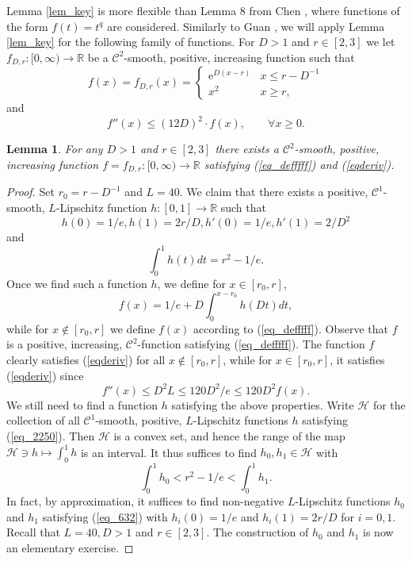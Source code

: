 \documentclass[12pt,a4paper]{article}
\newcommand{\e}{\mathrm{e}}
\newcommand{\RR}{\mathbb{R}}
\newtheorem{lemma}[theorem]{Lemma}
\theoremstyle{definition}
\newcommand{\cH}{\mathcal{H}}
\begin{document}
%
Lemma \ref{lem_key} is more flexible than Lemma 8 from Chen \cite{chen}, where functions of the form $f(t) = t^q$ are considered. Similarly to Guan \cite{guan}, we will apply 
Lemma \ref{lem_key} for the following family of functions. For
$D > 1$ and $r \in [2,3]$ we let $f_{D,r}: [0, \infty) \rightarrow \RR$ be a $\mathcal C^2$-smooth, positive, increasing function such that
\begin{equation}\label{eq_defffff}
f(x) = f_{D,r} (x) = \begin{cases}
 \e^{D(x - r)} & x \leq r- D^{-1} \\
 x^2  & x \geq r ,
 \end{cases}
\end{equation}
and
\begin{equation} \label{eqderiv}
f'' (x) \leq (12 D)^2 \cdot f(x) , \qquad \forall x \geq 0 .
\end{equation}

\begin{lemma} For any $D > 1$ and $r \in [2,3]$ there exists a $\mathcal C^2$-smooth, positive, increasing function $f = f_{D,r}: [0, \infty) \rightarrow \RR$ satisfying 
(\ref{eq_defffff}) and (\ref{eqderiv}). \label{lem_1444}
\end{lemma}

\begin{proof} Set $r_0 = r - D^{-1}$ and $L = 40$. We claim that there exists a positive, $\mathcal C^1$-smooth, $L$-Lipschitz function $h: [0, 1] \rightarrow \RR$
such that 
\begin{equation}  h(0) = 1/e, h(1) = 2 r/D, h'(0) = 1/e, h'(1) = 2 / D^2  \label{eq_2250} 
\end{equation}
and 
$$\int_{0}^1 h(t) dt =  r^2 - 1/e. 
$$
Once we find such a function $h$, we define for $x \in [r_0, r]$,
$$ f(x) = 1/e + D \int_{0}^{x-r_0} h \left( D t \right) dt, $$
while for $x \not \in [r_0, r]$ we define $f(x)$ according to (\ref{eq_defffff}). Observe that $f$ is a positive, increasing, $\mathcal C^2$-function
satisfying (\ref{eq_defffff}). The function $f$ clearly satisfies (\ref{eqderiv}) for all $x \not \in [r_0, r]$, 
while for $x \in [r_0, r]$, it satisfies (\ref{eqderiv}) since
 $$ f''(x)  \leq D^2 L \leq 120 D^2 / e \leq 120 D^2 f(x). $$
We still need to find a function $h$ satisfying the above properties. Write $\cH$ for the collection of all $\mathcal C^1$-smooth, positive, $L$-Lipschitz functions $h$ satisfying (\ref{eq_2250}).
Then $\cH$ is a convex set, and hence the range of the map $\cH \ni h \mapsto \int_0^1 h$ is an interval.
It thus suffices to find $h_0, h_1 \in \cH$ with 
\begin{equation}  \int_0^1 h_0 < r^2 - 1/e < \int_0^1 h_1. \label{eq_632} \end{equation}
In fact, by approximation, it suffices to find non-negative $L$-Lipschitz functions $h_0$ and $h_1$ 
satisfying (\ref{eq_632}) with $h_i(0) = 1/e$ and $h_i(1) = 2r/D$ for $i=0,1$. Recall that $L = 40, D > 1$ and $r \in [2,3]$.
The construction of $h_0$ and $h_1$ is now an elementary exercise.
\end{proof}
\end{document}
